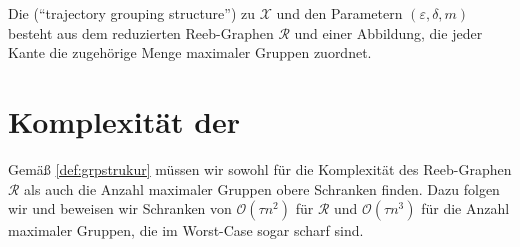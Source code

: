 \begin{definition}[{name=[{\GrpStruktur}]},label=def:grpstrukur]
	Die \bet{\GrpStruktur} (\enquote{trajectory grouping structure}) zu $\mathcal{X}$ und den Parametern $(\varepsilon,\delta,m)$ besteht aus dem reduzierten Reeb-Graphen $\mathcal{R}$ und einer Abbildung, die jeder Kante die zugehörige Menge maximaler Gruppen zuordnet.
\end{definition}

\section{Komplexität der \GrpStruktur} %
\label{sec:komplex}
Gemäß \cref{def:grpstrukur} müssen wir sowohl für die Komplexität des Reeb-Graphen $\mathcal{R}$ als auch die Anzahl maximaler Gruppen obere Schranken finden.
Dazu folgen wir \textcite[Sec.~2.1~\&~2.2]{buchin2015} und beweisen wir Schranken von $\mathcal{O}(\tau n^2)$ für $\mathcal{R}$ und $\mathcal{O}(\tau n^3)$ für die Anzahl maximaler Gruppen, die im Worst-Case sogar scharf sind.


